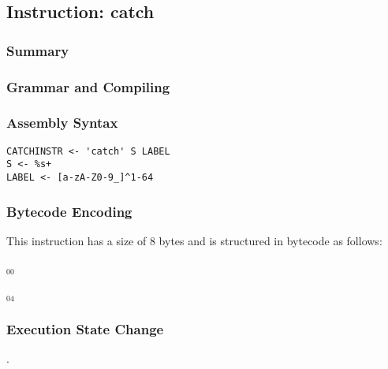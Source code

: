 \subsection{Instruction: catch}

\subsubsection{Summary}


\subsubsection{Grammar and Compiling}


\subsubsection{Assembly Syntax}

\begin{myquote}
\begin{verbatim}
CATCHINSTR <- 'catch' S LABEL
S <- %s+
LABEL <- [a-zA-Z0-9_]^1-64
\end{verbatim}
\end{myquote}


\subsubsection{Bytecode Encoding}

This instruction has a size of 8 bytes and is structured in bytecode as follows:

$_{00}$\ 



$_{04}$\ 


\subsubsection{Execution State Change}

.


